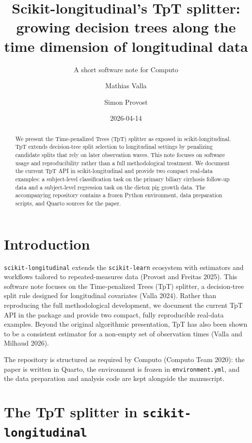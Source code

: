 \documentclass[
  letterpaper,
  DIV=11,
  numbers=noendperiod]{scrartcl}
\title{Scikit-longitudinal's TpT splitter: growing decision trees along
the time dimension of longitudinal data}
\subtitle{A short software note for Computo}
\author{Mathias Valla \and Simon Provost}
\date{2026-04-14}
\begin{document}
\maketitle
\begin{abstract}
We present the Time-penalized Trees (TpT) splitter as exposed in
scikit-longitudinal. TpT extends decision-tree split selection to
longitudinal settings by penalizing candidate splits that rely on later
observation waves. This note focuses on software usage and
reproducibility rather than a full methodological treatment. We document
the current TpT API in scikit-longitudinal and provide two compact
real-data examples: a subject-level classification task on the primary
biliary cirrhosis follow-up data and a subject-level regression task on
the dietox pig growth data. The accompanying repository contains a
frozen Python environment, data preparation scripts, and Quarto sources
for the paper.
\end{abstract}


\section{Introduction}\label{introduction}

\texttt{scikit-longitudinal} extends the \texttt{scikit-learn} ecosystem
with estimators and workflows tailored to repeated-measures data
(Provost and Freitas 2025). This software note focuses on the
Time-penalized Trees (TpT) splitter, a decision-tree split rule designed
for longitudinal covariates (Valla 2024). Rather than reproducing the
full methodological development, we document the current TpT API in the
package and provide two compact, fully reproducible real-data examples.
Beyond the original algorithmic presentation, TpT has also been shown to
be a consistent estimator for a non-empty set of observation times
(Valla and Milhaud 2026).

The repository is structured as required by Computo (Computo Team 2020):
the paper is written in Quarto, the environment is frozen in
\texttt{environment.yml}, and the data preparation and analysis code are
kept alongside the manuscript.

\section{\texorpdfstring{The TpT splitter in
\texttt{scikit-longitudinal}}{The TpT splitter in scikit-longitudinal}}\label{the-tpt-splitter-in-scikit-longitudinal}
\end{document}
